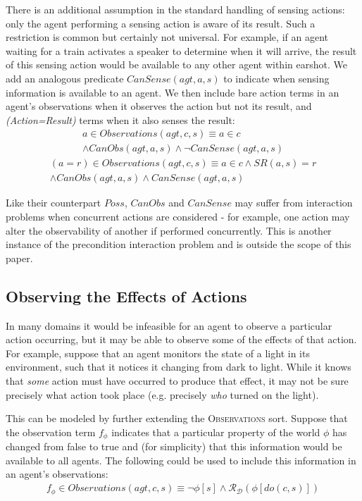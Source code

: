 \documentclass{ifaamas-submission}
\newcommand{\noun}[1]{\textsc{#1}}
\begin{document}
There is an additional assumption in the standard handling of sensing
actions: only the agent performing a sensing action is aware of its
result. Such a restriction is common but certainly not universal.
For example, if an agent waiting for a train activates a speaker to
determine when it will arrive, the result of this sensing action would
be available to any other agent within earshot. We add an analogous
predicate $CanSense(agt,a,s)$ to indicate when sensing information
is available to an agent. We then include bare action terms in an
agent's observations when it observes the action but not its result,
and \emph{(Action=Result)} terms when it also senses the result:\begin{multline*}
a\in Observations(agt,c,s)\equiv a\in c\\
\wedge CanObs(agt,a,s)\wedge\neg CanSense(agt,a,s)\end{multline*}
\begin{multline*}
(a=r)\in Observations(agt,c,s)\equiv a\in c\wedge SR(a,s)=r\\
\wedge CanObs(agt,a,s)\wedge CanSense(agt,a,s)\end{multline*}


Like their counterpart $Poss$, $CanObs$ and $CanSense$ may suffer
from interaction problems when concurrent actions are considered -
for example, one action may alter the observability of another if
performed concurrently. This is another instance of the precondition
interaction problem \cite{reiter96sc_nat_conc,pinto94temporal} and
is outside the scope of this paper.


\subsection{Observing the Effects of Actions}

In many domains it would be infeasible for an agent to observe a particular
action occurring, but it may be able to observe some of the effects
of that action. For example, suppose that an agent monitors the state
of a light in its environment, such that it notices it changing from
dark to light. While it knows that \emph{some} action must have occurred
to produce that effect, it may not be sure precisely what action took
place (e.g. precisely \emph{who} turned on the light).

This can be modeled by further extending the \noun{Observations} sort.
Suppose that the observation term $f_{\phi}$ indicates that a particular
property of the world $\phi$ has changed from false to true and (for
simplicity) that this information would be available to all agents.
The following could be used to include this information in an agent's
observations: \begin{multline*}
f_{\phi}\in Observations(agt,c,s)\equiv\neg\phi[s]\wedge\mathcal{R}_{\mathcal{D}}(\phi[do(c,s)])\end{multline*}
\end{document}
